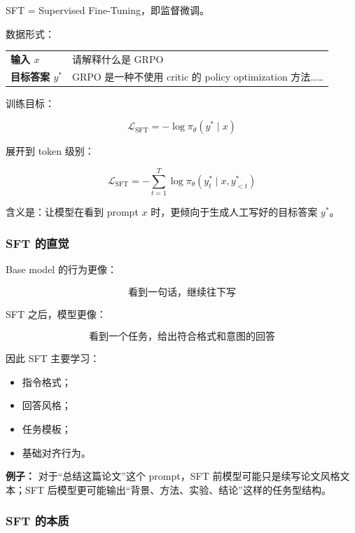 SFT = Supervised Fine-Tuning，即监督微调。

数据形式：

\begin{center}
{\small
\begin{tabular}{p{3cm}p{10cm}}
\hline
\textbf{输入 $x$} & 请解释什么是 GRPO \\
\textbf{目标答案 $y^\ast$} & GRPO 是一种不使用 critic 的 policy optimization 方法…… \\
\hline
\end{tabular}
}
\end{center}

训练目标：

\[
\mathcal{L}_\text{SFT} = - \log \pi_\theta(y^\ast \mid x)
\]

展开到 token 级别：

\[
\mathcal{L}_\text{SFT}
=
-\sum_{t=1}^{T}
\log \pi_\theta(y_t^\ast \mid x, y_{<t}^\ast)
\]

含义是：让模型在看到 prompt $x$ 时，更倾向于生成人工写好的目标答案 $y^\ast$。

\subsubsection{SFT 的直觉}

Base model 的行为更像：

\[
\text{看到一句话，继续往下写}
\]

SFT 之后，模型更像：

\[
\text{看到一个任务，给出符合格式和意图的回答}
\]

因此 SFT 主要学习：

\begin{itemize}[leftmargin=1.5em]
  \item 指令格式；
  \item 回答风格；
  \item 任务模板；
  \item 基础对齐行为。
\end{itemize}

\begin{intubox}
\textbf{例子：} 对于“总结这篇论文”这个 prompt，SFT 前模型可能只是续写论文风格文本；SFT 后模型更可能输出“背景、方法、实验、结论”这样的任务型结构。
\end{intubox}

\subsubsection{SFT 的本质}

